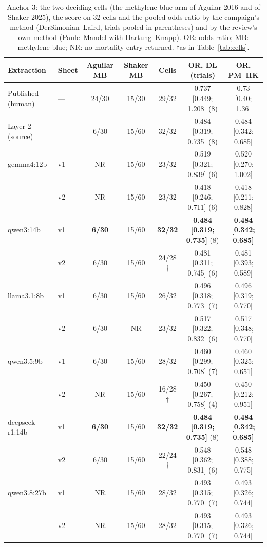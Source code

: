 \documentclass[11pt]{article}
\begin{document}
\begin{table}[!htbp]
\centering\footnotesize
\caption{Anchor 3: the two deciding cells (the methylene blue arm of Aguilar 2016 and of Shaker 2025), the score on 32 cells and the pooled odds ratio by the campaign's method (DerSimonian--Laird, trials pooled in parentheses) and by the review's own method (Paule--Mandel with Hartung--Knapp). OR: odds ratio; MB: methylene blue; NR: no mortality entry returned. $\dagger$as in Table~\ref{tab:cells}.}
\label{tab:a3}
\setlength{\tabcolsep}{2pt}
\begin{tabular}{llccccc}
\toprule
Extraction & Sheet & Aguilar MB & Shaker MB & Cells & OR, DL (trials) & OR, PM--HK \\
\midrule
Published (human) & --- & 24/30 & 15/30 & 29/32 & 0.737 [0.449; 1.208] (8) & 0.73 [0.40; 1.36] \\
Layer 2 (source) & --- & 6/30 & 15/60 & 32/32 & 0.484 [0.319; 0.735] (8) & 0.484 [0.342; 0.685] \\
\midrule
gemma4:12b & v1 & NR & 15/60 & 23/32 & 0.519 [0.321; 0.839] (6) & 0.520 [0.270; 1.002] \\
 & v2 & NR & 15/60 & 23/32 & 0.418 [0.246; 0.711] (6) & 0.418 [0.211; 0.828] \\
qwen3:14b & v1 & \textbf{6/30} & 15/60 & \textbf{32/32} & \textbf{0.484 [0.319; 0.735]} (8) & \textbf{0.484 [0.342; 0.685]} \\
 & v2 & 6/30 & 15/60 & 24/28$\dagger$ & 0.481 [0.311; 0.745] (6) & 0.481 [0.393; 0.589] \\
llama3.1:8b & v1 & 6/30 & 15/60 & 26/32 & 0.496 [0.318; 0.773] (7) & 0.496 [0.319; 0.770] \\
 & v2 & 6/30 & NR & 23/32 & 0.517 [0.322; 0.832] (6) & 0.517 [0.348; 0.770] \\
qwen3.5:9b & v1 & 6/30 & 15/60 & 28/32 & 0.460 [0.299; 0.708] (7) & 0.460 [0.325; 0.651] \\
 & v2 & NR & 15/60 & 16/28$\dagger$ & 0.450 [0.267; 0.758] (4) & 0.450 [0.212; 0.951] \\
deepseek-r1:14b & v1 & \textbf{6/30} & 15/60 & \textbf{32/32} & \textbf{0.484 [0.319; 0.735]} (8) & \textbf{0.484 [0.342; 0.685]} \\
 & v2 & 6/30 & 15/60 & 22/24$\dagger$ & 0.548 [0.362; 0.831] (6) & 0.548 [0.388; 0.775] \\
qwen3.8:27b & v1 & NR & 15/60 & 28/32 & 0.493 [0.315; 0.770] (7) & 0.493 [0.326; 0.744] \\
 & v2 & NR & 15/60 & 28/32 & 0.493 [0.315; 0.770] (7) & 0.493 [0.326; 0.744] \\
\bottomrule
\end{tabular}
\end{table}
\end{document}
